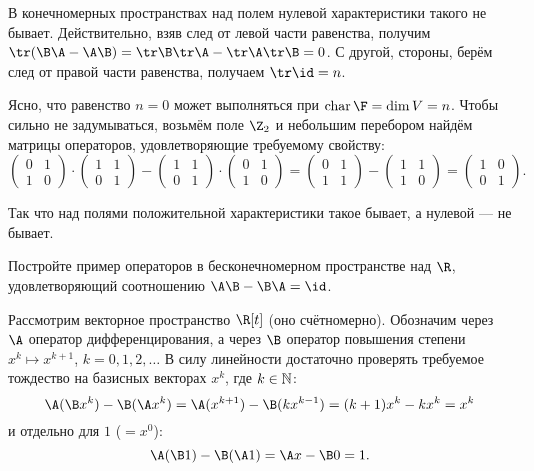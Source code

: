 \begin{solution}
    В конечномерных пространствах над полем нулевой характеристики такого не бывает. Действительно, взяв след от левой части равенства, получим $\tr(\B\A - \A\B) = \tr\B\tr\A - \tr\A\tr\B = 0$. С другой, стороны, берём след от правой части равенства, получаем $\tr\id = n$.

    Ясно, что равенство $n = 0$ может выполняться при $\operatorname{char}\F = \dim V = n$. Чтобы сильно не задумываться, возьмём поле $\Z_2$ и небольшим перебором найдём матрицы операторов, удовлетворяющие требуемому свойству:
    \[
        \begin{pmatrix}
            0 & 1\\
            1 & 0
        \end{pmatrix} \cdot
        \begin{pmatrix}
            1 & 1\\
            0 & 1
        \end{pmatrix} -
        \begin{pmatrix}
            1 & 1\\
            0 & 1
        \end{pmatrix} \cdot
        \begin{pmatrix}
            0 & 1\\
            1 & 0
        \end{pmatrix} =
        \begin{pmatrix}
            0 & 1\\
            1 & 1
        \end{pmatrix} -
        \begin{pmatrix}
            1 & 1\\
            1 & 0
        \end{pmatrix} =
        \begin{pmatrix}
            1 & 0\\
            0 & 1
        \end{pmatrix}.
    \]

    Так что над полями положительной характеристики такое бывает, а нулевой --- не бывает.
\end{solution}

\begin{problem}
    Постройте пример операторов в бесконечномерном пространстве над $\R$, удовлетворяющий соотношению $\A\B - \B\A = \id$.
\end{problem}

\begin{solution}
    Рассмотрим векторное пространство $\R[t]$ (оно счётномерно). Обозначим через $\A$ оператор дифференцирования, а через $\B$ оператор повышения степени $x^k \mapsto x^{k + 1}$, $k = 0, 1, 2, \ldots$ В силу линейности достаточно проверять требуемое тождество на базисных векторах $x^k$, где $k \in \mathbb{N}$:
    \[
        \A(\B x^k) - \B(\A x^k) = \A(x^{k + 1}) - \B(kx^{k - 1}) = (k + 1)x^k - kx^k = x^k
    \]
    и отдельно для $1$ ($= x^0$):
    \[
        \A(\B 1) - \B(\A 1) = \A x - \B 0 = 1.
    \]
\end{solution}


